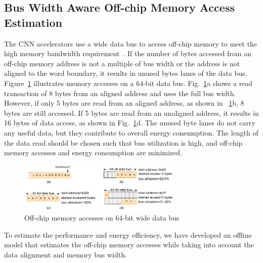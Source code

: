\documentclass[a4paper,10pt]{article}
\begin{document}
\subsection{Bus Width Aware Off-chip Memory Access Estimation}\label{sec:OffChipAccessModel}
The CNN accelerators use a wide data bus to access off-chip memory to meet the high memory bandwidth requirement~\cite{Chen2016EyerissAS,chen2014diannao}. If the number of bytes accessed from an off-chip memory address is not a multiple of bus width or the address is not aligned to the word boundary, it results in unused bytes lanes of the data bus. Figure~\ref{fig:AXI_AccesseOn64BitDataBus} illustrates memory accesses on a 64-bit data bus.  Fig.~\ref{fig:AXI_AccesseOn64BitDataBus}a shows a read transaction of 8 bytes from an aligned address and uses the full bus width. However, if only 5 bytes are read from an aligned address, as shown in \figurename~\ref{fig:AXI_AccesseOn64BitDataBus}b, 8 bytes are still accessed. If 5 bytes are read from an unaligned address, it results in 16 bytes of data access, as shown in Fig.~\ref{fig:AXI_AccesseOn64BitDataBus}d. The unused byte lanes do not carry any useful data, but they contribute to overall energy consumption. The length of the data read should be chosen such that bus utilization is high, and off-chip memory accesses and energy consumption are minimized.
\begin{figure}[!htb]
	\centering
	\includegraphics[width=0.7\textwidth]{./images/BurstTranscationOnAXI}
	\caption{Off-chip memory accesses on 64-bit wide data bus}
	\label{fig:AXI_AccesseOn64BitDataBus}
\end{figure}
To estimate the performance and energy efficiency, we have developed an offline model that estimates the off-chip memory accesses while taking into account the data alignment and memory bus width.
\end{document}
